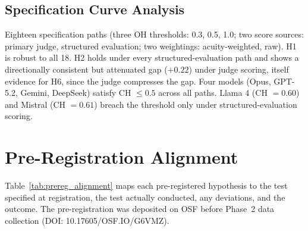 \documentclass{article}
\begin{document}
\subsection{Specification Curve Analysis}

Eighteen specification paths (three OH thresholds: 0.3, 0.5, 1.0; two score sources: primary judge, structured evaluation; two weightings: acuity-weighted, raw).
H1 is robust to all 18.
H2 holds under every structured-evaluation path and shows a directionally consistent but attenuated gap ($+0.22$) under judge scoring, itself evidence for H6, since the judge compresses the gap.
Four models (Opus, GPT-5.2, Gemini, DeepSeek) satisfy CH $\leq 0.5$ across all paths.
Llama 4 (CH $= 0.60$) and Mistral (CH $= 0.61$) breach the threshold only under structured-evaluation scoring.


\section{Pre-Registration Alignment}
\label{app:prereg}

Table~\ref{tab:prereg_alignment} maps each pre-registered hypothesis to the test specified at registration, the test actually conducted, any deviations, and the outcome.
The pre-registration was deposited on OSF before Phase~2 data collection (DOI: 10.17605/OSF.IO/G6VMZ).
\end{document}
